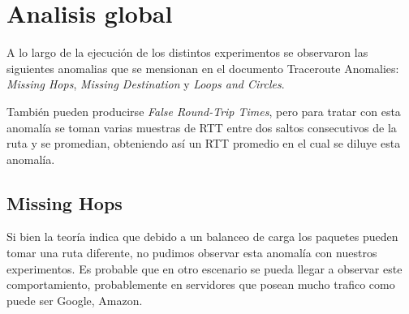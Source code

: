 \section{Analisis global}
A lo largo de la ejecución de los distintos experimentos se observaron las siguientes anomalias que se mensionan en el documento Traceroute Anomalies:
\emph{Missing Hops}, \emph{Missing Destination} y \emph{Loops and Circles}.

También pueden producirse \emph{False Round-Trip Times}, pero para tratar con esta anomalía se toman varias muestras de RTT entre dos saltos consecutivos de la ruta y se promedian, obteniendo así un RTT promedio en el cual se diluye esta anomalía.

\subsection{Missing Hops}

Si bien la teoría indica que debido a un balanceo de carga los paquetes pueden tomar una ruta diferente, no pudimos observar esta anomalía
con nuestros experimentos. Es probable que en otro escenario se pueda llegar a observar	este comportamiento, probablemente en servidores
que posean mucho trafico como puede ser Google, Amazon.
